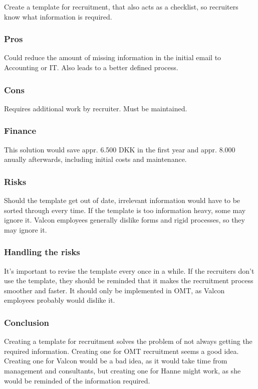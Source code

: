 Create a template for recruitment, that also acts as a checklist, so recruiters know what information is required.

\subsubsection{Pros} Could reduce the amount of missing information in the initial email to Accounting or IT. 
Also leads to a better defined process.

\subsubsection{Cons} Requires additional work by recruiter.
Must be maintained.

\subsubsection{Finance}
This solution would save appr. 6.500 DKK in the first year and appr. 8.000 anually afterwards, including initial costs and maintenance.

\subsubsection{Risks}
Should the template get out of date, irrelevant information would have to be sorted through every time. 
If the template is too information heavy, some may ignore it.
Valcon employees generally dislike forms and rigid processes, so they may ignore it.

\subsubsection{Handling the risks}
It's important to revise the template every once in a while.
If the recruiters don't use the template, they should be reminded that it makes the recruitment process smoother and faster.
It should only be implemented in OMT, as Valcon employees probably would dislike it.

\subsubsection{Conclusion}
Creating a template for recruitment solves the problem of not always getting the required information. 
Creating one for OMT recruitment seems a good idea.
Creating one for Valcon would be a bad idea, as it would take time from management and consultants, but creating one for Hanne might work, as she would be reminded of the information required.